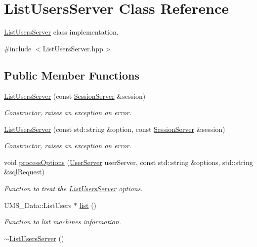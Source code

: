 \hypertarget{classListUsersServer}{
\section{ListUsersServer Class Reference}
\label{classListUsersServer}
}


\hyperlink{classListUsersServer}{ListUsersServer} class implementation.  




{\ttfamily \#include $<$ListUsersServer.hpp$>$}

\subsection*{Public Member Functions}
\begin{DoxyCompactItemize}
\item 
\hyperlink{classListUsersServer_a21aa9106a1ff470ac479651188e2ac31}{ListUsersServer} (const \hyperlink{classSessionServer}{SessionServer} \&session)
\begin{DoxyCompactList}\small\item\em Constructor, raises an exception on error. \item\end{DoxyCompactList}\item 
\hyperlink{classListUsersServer_a1d16ddcf7d953a2bf2a708d227141147}{ListUsersServer} (const std::string \&option, const \hyperlink{classSessionServer}{SessionServer} \&session)
\begin{DoxyCompactList}\small\item\em Constructor, raises an exception on error. \item\end{DoxyCompactList}\item 
void \hyperlink{classListUsersServer_a00e4e9819b12580de6fc59dfcc4f6d26}{processOptions} (\hyperlink{classUserServer}{UserServer} userServer, const std::string \&options, std::string \&sqlRequest)
\begin{DoxyCompactList}\small\item\em Function to treat the \hyperlink{classListUsersServer}{ListUsersServer} options. \item\end{DoxyCompactList}\item 
UMS\_\-Data::ListUsers $\ast$ \hyperlink{classListUsersServer_aa80dfdc8a71c1bbba1423f8b375e1624}{list} ()
\begin{DoxyCompactList}\small\item\em Function to list machines information. \item\end{DoxyCompactList}\item 
\hypertarget{classListUsersServer_a2ebe5504e39955f53b797dda01957ace}{
\hyperlink{classListUsersServer_a2ebe5504e39955f53b797dda01957ace}{$\sim$ListUsersServer} ()}
\label{classListUsersServer_a2ebe5504e39955f53b797dda01957ace}


\end{DoxyCompactItemize}
